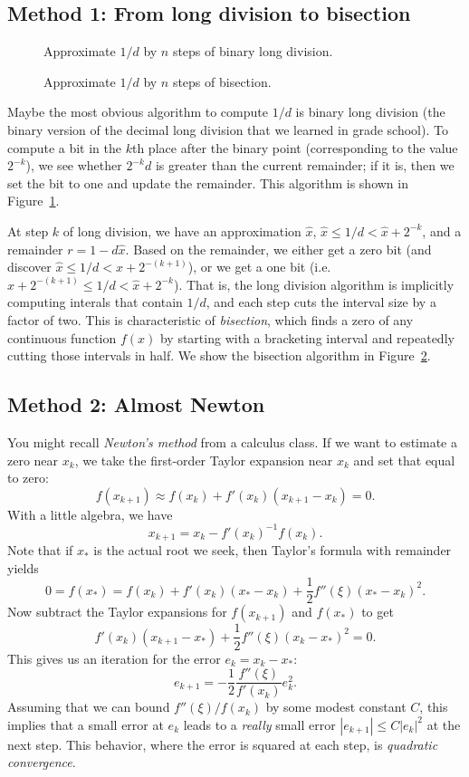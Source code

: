 \documentclass[12pt, leqno]{article}
\begin{document}
\subsection*{Method 1: From long division to bisection}

\begin{figure}

\caption{Approximate $1/d$ by $n$ steps of binary long division.}
\label{fig-division}
\end{figure}

\begin{figure}

\caption{Approximate $1/d$ by $n$ steps of bisection.}
\label{fig-bisect}
\end{figure}

Maybe the most obvious algorithm to compute $1/d$ is binary long
division (the binary version of the decimal long division that
we learned in grade school).  To compute a bit in the $k$th place
after the binary point (corresponding to the value $2^{-k}$), 
we see whether $2^{-k} d$ is greater than the current remainder;
if it is, then we set the bit to one and update the remainder.
This algorithm is shown in Figure~\ref{fig-division}.

At step $k$ of long division, we have an approximation $\hat{x}$,
$\hat{x} \leq 1/d < \hat{x}+2^{-k}$, and a remainder $r = 1-d
\hat{x}$.  Based on the remainder, we either get a zero bit (and
discover $\hat{x} \leq 1/d < \hat{x}+2^{-(k+1)}$), or we get a one bit
(i.e. $\hat{x}+2^{-(k+1)} \leq 1/d < \hat{x}+2^{-k}$).  That is,
the long division algorithm is implicitly computing interals that
contain $1/d$, and each step cuts the interval size by a factor of
two.  This is characteristic of {\em bisection}, which finds a zero
of any continuous function $f(x)$ by starting with a bracketing interval
and repeatedly cutting those intervals in half.  We show the
bisection algorithm in Figure~\ref{fig-bisect}.

\subsection*{Method 2: Almost Newton}

You might recall {\em Newton's method} from a calculus class.
If we want to estimate a zero near $x_k$, we take the first-order
Taylor expansion near $x_k$ and set that equal to zero:
\[
  f(x_{k+1}) \approx f(x_k) + f'(x_k)(x_{k+1}-x_k) = 0.
\]
With a little algebra, we have
\[
  x_{k+1} = x_k - f'(x_k)^{-1} f(x_k).
\]
Note that if $x_*$ is the actual root we seek, then
Taylor's formula with remainder yields
\[
  0 = f(x_*) = f(x_k) + f'(x_k)(x_*-x_k) + \frac{1}{2} f''(\xi) (x_*-x_k)^2.
\]
Now subtract the Taylor expansions for $f(x_{k+1})$ and $f(x_*)$ to get
\[
  f'(x_k)(x_{k+1}-x_*) + \frac{1}{2} f''(\xi) (x_k-x_*)^2 = 0.
\]
This gives us an iteration for the error $e_k = x_k-x_*$:
\[
  e_{k+1} = -\frac{1}{2} \frac{f''(\xi)}{f'(x_k)} e_k^2.
\]
Assuming that we can bound $f''(\xi)/f(x_k)$ by some modest constant $C$,
this implies that a small error at $e_k$ leads to a {\em really}
small error $|e_{k+1}| \leq C|e_k|^2$ at the next step.  This behavior,
where the error is squared at each step, is {\em quadratic convergence}.
\end{document}
